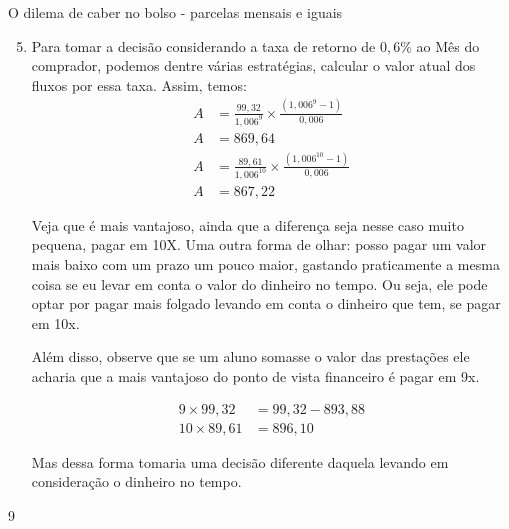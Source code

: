 \begin{answer}{O dilema de caber no bolso - parcelas mensais e iguais}
{
\begin{enumerate}\setcounter{enumi}{4}
\item Para tomar a decisão considerando a taxa de retorno de $0{,}6\%$ ao Mês do comprador, podemos dentre várias estratégias, calcular o valor atual dos fluxos por essa taxa. Assim, temos:
\begin{align*}
A&=\frac{99{,}32}{1{,}006^9}\times\frac{(1{,}006^9-1)}{0{,}006}\\
A&=869{,}64\\
A&=\frac{89{,}61}{1{,}006^10}\times\frac{(1{,}006^10-1)}{0{,}006}\\
A&=867{,}22
\end{align*}

Veja que é mais vantajoso, ainda que a diferença seja nesse caso muito pequena, pagar em 10X. Uma outra forma de olhar: posso pagar um valor mais baixo com um prazo um pouco maior, gastando praticamente a mesma coisa se eu levar em conta o valor do dinheiro no tempo. Ou seja, ele pode optar por pagar mais folgado levando em conta o dinheiro que tem, se pagar em 10x.

Além disso, observe que se um aluno somasse o valor das prestações ele acharia que a mais vantajoso do ponto de vista financeiro é pagar em 9x. 

\begin{align*}
9\times99{,}32&=99{,}32-893{,}88\\
10\times89{,}61&=896{,}10
\end{align*}

Mas dessa forma tomaria uma decisão diferente daquela levando em consideração o dinheiro no tempo. 
\end{enumerate}
}{9}
\end{answer}
